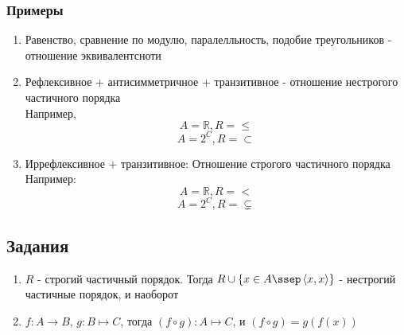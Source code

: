\documentclass[11pt, oneside]{article}   	%
\begin{document}
        \subsubsection{Примеры}
            \begin{enumerate}
                \item Равенство, сравнение по модулю, паралелльность, подобие треугольников - отношение эквивалентсноти
                \item Рефлексивное + антисимметричное + транзитивное - отношение нестрогого частичного порядка\\
                Например, 
                \[A=\mathbb{R}, R = \le\]
                \[A=2^C,  R = \subset\]
                \item Иррефлексивное + транзитивное: Отношение строгого частичного порядка\\
                    Например: 
                    \[A=\mathbb{R}, R = <\]
                    \[A=2^C, R = \subsetneq\] 
            \end{enumerate} 
    \subsection{Задания}
        \begin{enumerate}
            \item $R$ - строгий частичный порядок. Тогда  $R\cup \{x \in A\ssep\left<x, x\right>\} $ - нестрогий частичные порядок, и наоборот
            \item $f: A \to B$, $g: B \mapsto C$, тогда $(f \circ g): A \mapsto C$, и $(f \circ g) = g(f(x))$
        \end{enumerate}
         
\end{document}

